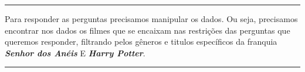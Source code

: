 \documentclass[]{article}
\newenvironment{Shaded}{\begin{snugshade}}{\end{snugshade}}
\newcommand{\KeywordTok}[1]{\textcolor[rgb]{0.13,0.29,0.53}{\textbf{#1}}}
\newcommand{\StringTok}[1]{\textcolor[rgb]{0.31,0.60,0.02}{#1}}
\newcommand{\CommentTok}[1]{\textcolor[rgb]{0.56,0.35,0.01}{\textit{#1}}}
\newcommand{\OperatorTok}[1]{\textcolor[rgb]{0.81,0.36,0.00}{\textbf{#1}}}
\newcommand{\NormalTok}[1]{#1}
\begin{document}
\begin{center}\rule{0.5\linewidth}{\linethickness}\end{center}

Para responder as perguntas precisamos manipular os dados. Ou seja,
precisamos encontrar nos dados os filmes que se encaixam nas restrições
das perguntas que queremos responder, filtrando pelos gêneros e titulos
específicos da franquia \textbf{\emph{Senhor dos Anéis}} E
\textbf{\emph{Harry Potter}}.

\begin{center}\rule{0.5\linewidth}{\linethickness}\end{center}

\begin{Shaded}
\end{Shaded}
\end{document}
